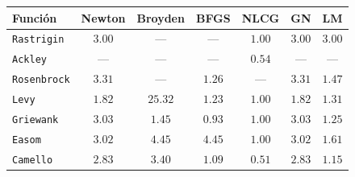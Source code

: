 \begin{tabular}{l c c c c c c}
\toprule
\rowcolor{Azul1!50}
Función & Newton & Broyden & BFGS & NLCG & GN & LM \\
\midrule
\texttt{Rastrigin} & $3.00$ & --- & --- & $1.00$ & $3.00$ & $3.00$ \\
\texttt{Ackley} & --- & --- & --- & $0.54$ & --- & --- \\
\texttt{Rosenbrock} & $3.31$ & --- & $1.26$ & --- & $3.31$ & $1.47$ \\
\texttt{Levy} & $1.82$ & $25.32$ & $1.23$ & $1.00$ & $1.82$ & $1.31$ \\
\texttt{Griewank} & $3.03$ & $1.45$ & $0.93$ & $1.00$ & $3.03$ & $1.25$ \\
\texttt{Easom} & $3.02$ & $4.45$ & $4.45$ & $1.00$ & $3.02$ & $1.61$ \\
\texttt{Camello} & $2.83$ & $3.40$ & $1.09$ & $0.51$ & $2.83$ & $1.15$ \\
\bottomrule
\end{tabular}
